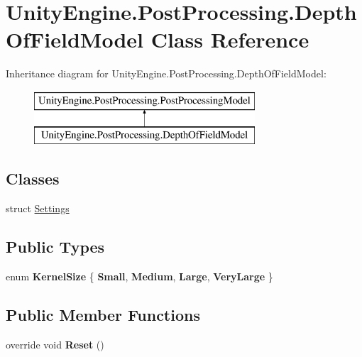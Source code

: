 \hypertarget{class_unity_engine_1_1_post_processing_1_1_depth_of_field_model}{}\section{Unity\+Engine.\+Post\+Processing.\+Depth\+Of\+Field\+Model Class Reference}
\label{class_unity_engine_1_1_post_processing_1_1_depth_of_field_model}
Inheritance diagram for Unity\+Engine.\+Post\+Processing.\+Depth\+Of\+Field\+Model\+:\begin{figure}[H]
\begin{center}
\leavevmode
\includegraphics[height=2.000000cm]{class_unity_engine_1_1_post_processing_1_1_depth_of_field_model}
\end{center}
\end{figure}
\subsection*{Classes}
\begin{DoxyCompactItemize}
\item 
struct \hyperlink{struct_unity_engine_1_1_post_processing_1_1_depth_of_field_model_1_1_settings}{Settings}
\end{DoxyCompactItemize}
\subsection*{Public Types}
\begin{DoxyCompactItemize}
\item 
\mbox{\label{class_unity_engine_1_1_post_processing_1_1_depth_of_field_model_a8b92e9c86b4ffe225306853f8bfd4015}} 
enum {\bfseries Kernel\+Size} \{ {\bfseries Small}, 
{\bfseries Medium}, 
{\bfseries Large}, 
{\bfseries Very\+Large}
 \}
\end{DoxyCompactItemize}
\subsection*{Public Member Functions}
\begin{DoxyCompactItemize}
\item 
\mbox{\label{class_unity_engine_1_1_post_processing_1_1_depth_of_field_model_aed85b9c87b7fd8c5844d44ff7883309c}} 
override void {\bfseries Reset} ()
\end{DoxyCompactItemize}
